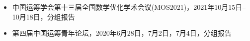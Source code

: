 %
%


{
\fontsize{9.5pt}{\baselineskip}\selectfont

\begin{itemize}[leftmargin=*]
	\item 中国运筹学会第十三届全国数学优化学术会议(MOS2021)，2021年10月15日-- 10月18日，分组报告
	\item 第四届中国运筹青年论坛，2020年6月28日，7月2日，7月4日，分组报告
\end{itemize}
}